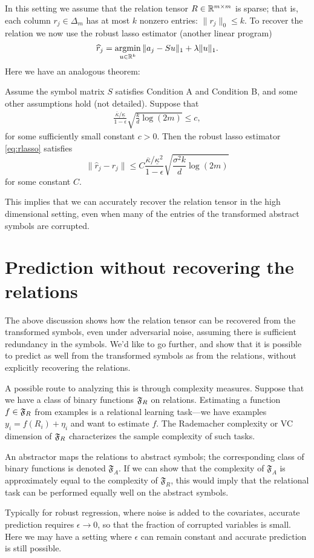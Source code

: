  In this setting we assume that the relation tensor $R \in \mathbb{R}^{m\times m}$ is sparse; that is, 
 each column $r_j \in \Delta_m$ has at most $k$ nonzero entries: $\|r_j\|_0 \leq k$. To recover the relation 
 we now use the robust lasso estimator (another linear program)
\begin{equation}
  \hat r_j = \argmin_{u \in\reals^k} \| a_j - S u\|_1 + \lambda\|u\|_1. \label{eq:rlasso}
\end{equation}  
Here we have an analogous theorem:
\begin{thm}
  Assume the symbol matrix $S$ satisfies Condition A and Condition B, and some other assumptions hold (not detailed). Suppose that 
\begin{eqnarray}
  \frac{\overline{\kappa}/\underline{\kappa}}{1-\epsilon}\sqrt{\frac{k}{d}\log(2m)}\leq c,
\end{eqnarray}
for some sufficiently small constant $c>0$. Then the robust lasso estimator \eqref{eq:rlasso} satisfies
\begin{equation}
  \|\hat r_j - r_j\| \leq C \frac{\overline{\kappa}/\underline{\kappa}^2}{1-\epsilon} \sqrt{\frac{\sigma^2 k}{d} \log(2m)}
\end{equation}
for some constant $C$.
\end{thm}
This implies that we can accurately recover the relation tensor in the high dimensional setting, even when many of the entries of the transformed abstract symbols are corrupted.

\section{Prediction without recovering the relations}

The above discussion shows how the relation tensor can be recovered from the transformed symbols, even under adversarial noise, assuming there is sufficient redundancy in the symbols. We'd like to go further, and show that it is possible to predict as well from the transformed symbols as from the relations, without explicitly recovering the relations. 

A possible route to analyzing this is through complexity measures.  
Suppose that we have a class of binary functions ${\mathfrak{F}}_R$ on relations. Estimating a function $f\in{\mathfrak{F}}_R$ 
from examples is a relational learning task---we have examples $y_i = f(R_i) + \eta_i$ and want to estimate $f$. The Rademacher complexity or 
VC dimension of ${\mathfrak{F}}_R$ characterizes the sample complexity of such tasks.

An abstractor 
maps the relations to abstract symbols; the corresponding class of binary functions is denoted $\mathfrak{F}_A$. If we can 
show that the complexity of $\mathfrak{F}_A$ is approximately equal to the complexity of $\mathfrak{F}_R$,  
  this would imply that the relational task can be performed equally well on the abstract symbols. 

Typically for robust regression, where noise is added to the covariates, accurate prediction requires $\epsilon\to 0$, so that the fraction of corrupted variables is small. Here we may have a setting where 
$\epsilon$ can remain constant and accurate prediction is still possible.




